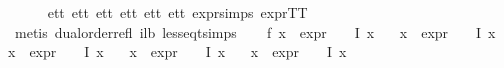 \begin{isabellebody}
\ \ \ \ \isamarkupfalse%
\ e{}{\isacharunderscore}{\kern0pt}tt\ e{}{\isacharunderscore}{\kern0pt}tt\ e{}{\isacharunderscore}{\kern0pt}tt\ e{}{\isacharunderscore}{\kern0pt}tt\ e{}{\isacharunderscore}{\kern0pt}tt\ e{}{\isacharunderscore}{\kern0pt}tt\ expr{\isachardot}{\kern0pt}simps\ expr{\isacharunderscore}{\kern0pt}TT\isanewline
\ \ \ \ \isamarkupfalse%
\ {\isacharparenleft}{\kern0pt}metis\ dual{\isacharunderscore}{\kern0pt}order{\isachardot}{\kern0pt}refl\ i{}{\isacharunderscore}{\kern0pt}lb\ less{\isacharunderscore}{\kern0pt}eq{\isacharunderscore}{\kern0pt}t{\isachardot}{\kern0pt}simps{\isacharparenright}{\kern0pt}\isanewline
\ \ \isamarkupfalse%
\ f{}{\isacharcolon}{\kern0pt}\ {\isachardoublequoteopen}{\isasymforall}x\ {\isasymin}\ {\isacharparenleft}{\kern0pt}{\isacharparenleft}{\kern0pt}expr{\isacharunderscore}{\kern0pt}{}\ {\isasymcirc}\ {\isasymPhi}{\isacharparenright}{\kern0pt}\ {\isacharbackquote}{\kern0pt}\ I{\isacharparenright}{\kern0pt}{\isachardot}{\kern0pt}\ x\ {\isasymle}\ {}{\isachardoublequoteclose}\isanewline
\ {\isachardoublequoteopen}{\isasymforall}x\ {\isasymin}\ {\isacharparenleft}{\kern0pt}{\isacharparenleft}{\kern0pt}expr{\isacharunderscore}{\kern0pt}{}\ {\isasymcirc}\ {\isasymPhi}{\isacharparenright}{\kern0pt}\ {\isacharbackquote}{\kern0pt}\ I{\isacharparenright}{\kern0pt}{\isachardot}{\kern0pt}\ x\ {\isasymle}\ {}{\isachardoublequoteclose}\isanewline
{\isachardoublequoteopen}{\isasymforall}x\ {\isasymin}\ {\isacharparenleft}{\kern0pt}{\isacharparenleft}{\kern0pt}expr{\isacharunderscore}{\kern0pt}{}\ {\isasymcirc}\ {\isasymPhi}{\isacharparenright}{\kern0pt}\ {\isacharbackquote}{\kern0pt}\ I{\isacharparenright}{\kern0pt}{\isachardot}{\kern0pt}\ x\ {\isasymle}\ {}{\isachardoublequoteclose}\isanewline
\ {\isachardoublequoteopen}{\isasymforall}x\ {\isasymin}\ {\isacharparenleft}{\kern0pt}{\isacharparenleft}{\kern0pt}expr{\isacharunderscore}{\kern0pt}{}\ {\isasymcirc}\ {\isasymPhi}{\isacharparenright}{\kern0pt}\ {\isacharbackquote}{\kern0pt}\ I{\isacharparenright}{\kern0pt}{\isachardot}{\kern0pt}\ x\ {\isasymle}\ {}{\isachardoublequoteclose}\isanewline
\ {\isachardoublequoteopen}{\isasymforall}x\ {\isasymin}\ {\isacharparenleft}{\kern0pt}{\isacharparenleft}{\kern0pt}expr{\isacharunderscore}{\kern0pt}{}\ {\isasymcirc}\ {\isasymPhi}{\isacharparenright}{\kern0pt}\ {\isacharbackquote}{\kern0pt}\ I{\isacharparenright}{\kern0pt}{\isachardot}{\kern0pt}\ x\ {\isasymle}\ {}{\isachardoublequoteclose}\isanewline

\end{isabellebody}
